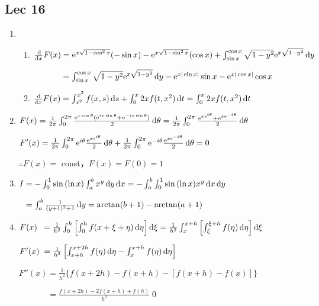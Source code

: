 \subsection{Lec 16}
\begin{enumerate}[1]
    \item 
    \begin{enumerate}[(1)]
        \item 
        $\frac{\dif }{\dif x}F(x)=\me^{x\sqrt{1-\cos^2{x}}}(-\sin{x})-\me^{x\sqrt{1-\sin^2{x}}}(\cos{x})+\int_{\sin{x}}^{\cos{x}}\sqrt{1-y^2}\me^{x\sqrt{1-y^2}}\dif y$
        \par $\phantom{\frac{\dif }{\dif x}F(x)}=\int_{\sin{x}}^{\cos{x}}\sqrt{1-y^2}\me^{x\sqrt{1-y^2}}\dif y-\me^{x|\sin{x}|}\sin{x}-\me^{x|\cos{x}|}\cos{x}$

        \item  
        $\frac{\dif }{\dif x}F(x)=\int_{x^2}^{x^2}f(x,s)\dif s+\int_{0}^{x}2xf(t,x^2)\dif t=\int_{0}^{x}2xf(t,x^2)\dif t$
        
    \end{enumerate}
    \item 
    $F(x)=\frac{1}{2\pi}\int_{0}^{2\pi}\frac{\me^{x\cos{\theta}}(\me^{ix\sin{\theta}}+\me^{-ix\sin{\theta}})}{2}\dif \theta=\frac{1}{2\pi}\int_{0}^{2\pi}\frac{\me^{x\me^{i\theta}}+\me^{x\me^{-i\theta}}}{2}\dif \theta$
    \par $F'(x)=\frac{1}{2\pi}\int_{0}^{2\pi}\me^{i\theta}\frac{\me^{x\me^{i\theta}}}{2}\dif \theta+\frac{1}{2\pi}\int_{0}^{2\pi}\me^{-i\theta}\frac{\me^{x\me^{-i\theta}}}{2}\dif \theta=0$
    \par $\therefore F(x)= $ const，$F(x)=F(0)=1$

    \item 
    $I=-\int_0^1\sin{(\ln{x})}\int_a^bx^y\dif y\dif x=-\int_a^b\int_0^1\sin{(\ln{x})}x^y\dif x\dif y$
    \par $\phantom{I}=\int_a^b\frac{1}{(y+1)^2+1}\dif y=\arctan(b+1)-\arctan(a+1)$

    \item 
    $F(x)\phantom{''}=\frac{1}{h^2}\int_0^h\left[\int_0^hf(x+\xi+\eta)\dif \eta\right]\dif \xi=\frac{1}{h^2}\int_x^{x+h}\left[\int_\xi^{\xi+h}f(\eta)\dif \eta\right]\dif \xi$
    \par $F'(x)\phantom{'}=\frac{1}{h^2}\left[\int_{x+h}^{x+2h}f(\eta)\dif \eta-\int_{x}^{x+h}f(\eta)\dif \eta\right]$
    \par $F''(x)=\frac{1}{h^2}\{f(x+2h)-f(x+h)-[f(x+h)-f(x)]\}$
    \par$\phantom{F''(x)} =\frac{f(x+2h)-2f(x+h)+f(h)}{h^2}$\qed
\end{enumerate}

